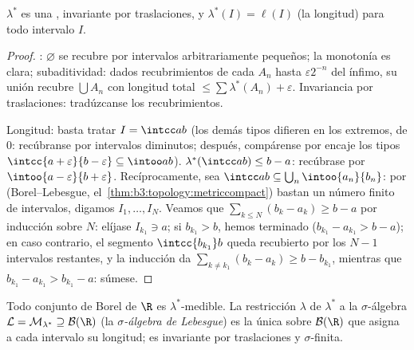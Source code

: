 \begin{lemma}\label{lem:b3:measure:outerbasics}
$\lambda^*$ es una ,
invariante por traslaciones, y $\lambda^*(I) = \ell(I)$ (la longitud)
para todo intervalo
$I$.
\end{lemma}

\begin{proof}
: $\varnothing$ se recubre
por intervalos arbitrariamente pequeños; la monotonía es clara;
subaditividad: dados recubrimientos de cada $A_n$ hasta
$\varepsilon 2^{-n}$ del ínfimo, su unión recubre $\bigcup A_n$ con
longitud total $\leq \sum
\lambda^*(A_n) + \varepsilon$. Invariancia por traslaciones: tradúzcanse
los recubrimientos.

Longitud: basta tratar $I = \intcc ab$ (los demás tipos difieren en los
extremos, de  $0$:
recúbranse por intervalos diminutos; después, compárense por encaje los
tipos $\intcc{a+\varepsilon}{b -
\varepsilon} \subseteq \intoo ab$). $\lambda^*(\intcc ab) \leq b - a$:
recúbrase por $\intoo{a-\varepsilon}{b+\varepsilon}$. Recíprocamente,
sea $\intcc
ab \subseteq \bigcup_n\intoo{a_n}{b_n}$: por \emph{}
(Borel--Lebesgue, el~\cref{thm:b3:topology:metriccompact}) bastan un
número finito de intervalos, digamos $I_1, \dots, I_N$. Veamos que
$\sum_{k\leq N}(b_k -
a_k) \geq b - a$ por inducción sobre $N$: elíjase $I_{k_1} \ni a$; si
$b_{k_1} > b$, hemos terminado ($b_{k_1} - a_{k_1} > b - a$); en caso
contrario, el segmento $\intcc{b_{k_1}}b$ queda recubierto por los
$N - 1$ intervalos restantes, y la inducción da
$\sum_{k \neq k_1}(b_k - a_k)
\geq b - b_{k_1}$, mientras que $b_{k_1} - a_{k_1} > b_{k_1} - a$:
súmese.
\end{proof}

\begin{theorem}\label{thm:b3:measure:lebesgue}
Todo conjunto de Borel de $\R$ es $\lambda^*$-medible. La restricción
$\lambda$ de $\lambda^*$ a la $\sigma$-álgebra
$\mathcal L = \mathcal M_{\lambda^*} \supseteq \mathcal B(\R)$
(la \emph{$\sigma$-álgebra de Lebesgue}) es la única
 sobre $\mathcal B(\R)$ que
asigna a cada intervalo su longitud; es invariante por traslaciones y
$\sigma$-finita.
\end{theorem}

